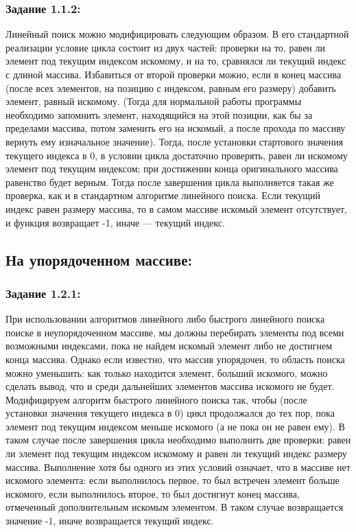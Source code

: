 \documentclass[12pt]{article}
\begin{document}
	{\parskip=0.15cm
	
	\subsubsection{Задание 1.1.2:}
	\label{task_1_1_2}
	
	Линейный поиск можно модифицировать следующим образом. В его стандартной реализации условие цикла состоит из двух частей: проверки на то, равен ли элемент под текущим индексом искомому, и на то, сравнялся ли текущий индекс с длиной массива. Избавиться от второй проверки можно, если в конец массива (после всех элементов, на позицию с индексом, равным его размеру) добавить элемент, равный искомому. (Тогда для нормальной работы программы необходимо запомнить элемент, находящийся на этой позиции, как бы за пределами массива, потом заменить его на искомый, а после прохода по массиву вернуть ему изначальное значение). Тогда, после установки стартового значения текущего индекса в 0, в условии цикла достаточно проверять, равен ли искомому элемент под текущим индексом; при достижении конца оригинального массива равенство будет верным.  Тогда после завершения цикла выполняется такая же проверка, как и в стандартном алгоритме линейного поиска. Если текущий индекс равен размеру массива, то в самом массиве искомый элемент отсутствует, и функция возвращает -1, иначе --- текущий индекс.  
	
	 
	
	\subsection{На упорядоченном массиве:}
	\label{task_1_2}
	\subsubsection{Задание 1.2.1:}
	\label{task_1_2_1}
	
	При использовании алгоритмов линейного либо быстрого линейного поиска поиске в неупорядоченном массиве, мы должны перебирать элементы под всеми возможными индексами, пока не найдем искомый элемент либо не достигнем конца массива. Однако если известно, что массив упорядочен, то область поиска можно уменьшить: как только находится элемент, больший искомого, можно сделать вывод, что и среди дальнейших элементов массива искомого не будет. Модифицируем алгоритм быстрого линейного поиска так, чтобы (после установки значения текущего индекса в 0) цикл продолжался до тех пор, пока элемент под текущим индексом меньше искомого (а не пока он не равен ему). В таком случае после завершения цикла необходимо выполнить две проверки: равен ли элемент под текущим индексом искомому и равен ли текущий индекс размеру массива. Выполнение хотя бы одного из этих условий означает, что в массиве нет искомого элемента: если выполнилось первое, то был встречен элемент больше искомого, если выполнилось второе, то был достигнут конец массива, отмеченный дополнительным искомым элементом. В таком случае возвращается значение -1, иначе возвращается текущий индекс.
	
}
\end{document}
